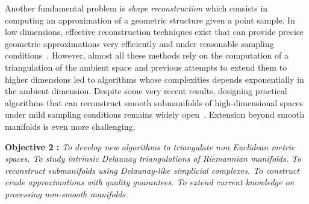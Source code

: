 Another fundamental problem is {\em shape reconstruction} which consists in computing an approximation of a geometric structure given a point sample.  In low dimensions, effective reconstruction techniques exist that can provide precise geometric approximations very efficiently and under reasonable sampling conditions~\cite{dey-csr-2007}. %
However,   almost all these methods rely on the computation of a triangulation of the ambient space and previous attempts to extend them to higher dimensions led to algorithms whose complexities depends exponentially in the ambient dimension.  Despite some very recent results, designing practical algorithms that can reconstruct smooth submanifolds of high-dimensional spaces under mild sampling conditions remains widely open~\cite{geometrica-7142i}. Extension beyond smooth manifolds is even more challenging.


\vspace{2mm}

{\bf Objective 2 :}  {\em To   develop new algorithms to {\em  triangulate non Euclidean metric spaces}. To study intrinsic Delaunay triangulations of Riemannian manifolds.  To reconstruct submanifolds using Delaunay-like simplicial complexes. To construct crude approximations 
with quality guarantees. To extend current knowledge on processing non-smooth manifolds. }

